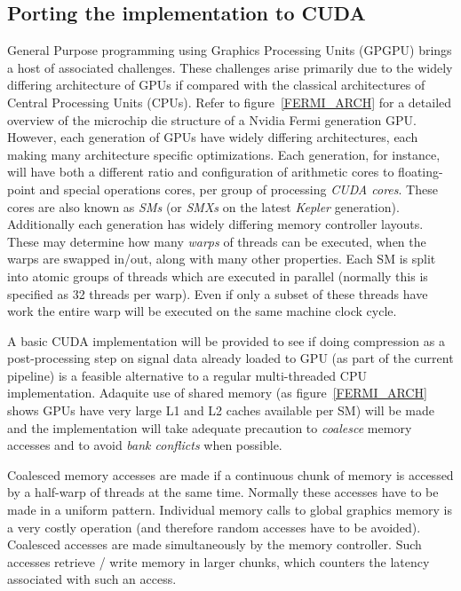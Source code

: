 \subsection{Porting the implementation to CUDA}
General Purpose programming using Graphics Processing Units (GPGPU) brings a host of associated challenges. These challenges arise primarily due to the widely differing architecture of GPUs if compared
with the classical architectures of Central Processing Units (CPUs). Refer to figure~\ref{FERMI_ARCH} for a detailed overview of the microchip die structure of a Nvidia Fermi generation GPU. 
However, each generation of GPUs have widely differing architectures, each making many architecture specific optimizations. Each generation, for instance, will have both a 
different ratio and configuration of arithmetic cores to floating-point and special operations cores, per group of processing \textit{CUDA cores}. These cores are also known as 
\textit{SMs} (or \textit{SMXs} on the latest \textit{Kepler} generation). Additionally each generation has widely differing memory controller layouts. These may determine 
how many \textit{warps} of threads can be executed, when the warps are swapped in/out, along with many other properties. Each SM is split into atomic groups of threads which are executed
in parallel (normally this is specified as 32 threads per warp). Even if only a subset of these threads have work the entire warp will be executed on the same machine clock cycle.

A basic CUDA implementation will be provided to see if doing compression as a post-processing step on signal data already loaded to GPU (as part of the current pipeline) is a 
feasible alternative to a regular multi-threaded CPU implementation. Adaquite use of shared memory (as figure~\ref{FERMI_ARCH} shows GPUs have very large L1 and L2 caches available per SM) 
will be made and the implementation will take adequate precaution to \textit{coalesce} memory accesses and to avoid \textit{bank conflicts} when possible. 

Coalesced memory accesses are made if a continuous chunk of memory is accessed by a half-warp of threads at the same time. Normally these accesses have to be made in a uniform pattern. 
Individual memory calls to global graphics memory is a very costly operation (and therefore random accesses have to be avoided). Coalesced accesses are made simultaneously by the 
memory controller. Such accesses retrieve / write memory in larger chunks, which counters the latency associated with such an access. 

